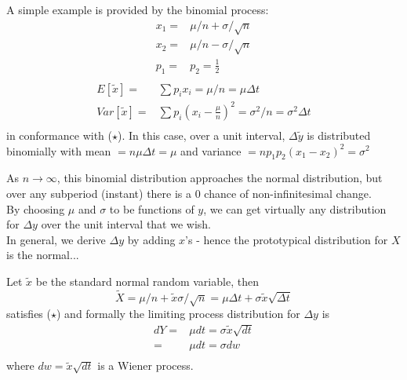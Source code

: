 \documentclass[
14pt,notheorems,hyperref={pdfauthor=whatever}
]{beamer}
\begin{document}
\begin{frame}
A simple example is provided by the binomial process:\\
\begin{align*}
    x_1 =& \mu/n + \sigma/\sqrt{n}\\
    x_2 =& \mu/n - \sigma/\sqrt{n}\\
    p_1 =& p_2 = \frac{1}{2}\\
\end{align*}
\begin{align*}
    E[\tilde x] =& \sum p_i x_i = \mu / n = \mu \Delta t\\
    Var[\tilde x] =& \sum p_i (x_i-\frac{\mu}{n})^2 = \sigma^2/n = \sigma^2 \Delta t\\
\end{align*}
in conformance with ($\star$). In this case, over a unit interval, $\Delta \tilde y$ is distributed binomially with mean $=n\mu\Delta t = \mu$ and variance $=np_1p_2(x_1-x_2)^2=\sigma^2$\\
\end{frame}

\begin{frame}
As $n\to\infty$, this binomial distribution approaches the normal distribution, but over any subperiod (instant) there is a 0 chance of non-infinitesimal change.\\
\hfill\break
By choosing $\mu$ and $\sigma$ to be functions of $y$, we can get virtually any distribution for $\Delta y$ over the unit interval that we wish.\\
\hfill\break
In general, we derive $\Delta y$ by adding $x$'s - hence the prototypical distribution for $X$ is the normal...\\
\end{frame}

\begin{frame}
Let $\tilde x$ be the standard normal random variable, then\\
\[\tilde X = \mu/n + \tilde x \sigma/\sqrt{n} = \mu \Delta t + \sigma\tilde x \sqrt{\Delta t}\]
satisfies ($\star$) and formally the limiting process distribution for $\Delta y$ is\\
\begin{align*}
    dY =& \mu dt = \sigma \tilde x \sqrt{dt}\\
    =& \mu dt = \sigma dw\\
\end{align*}
where $dw=\tilde x \sqrt{dt}$ is a Wiener process.\\
\end{frame}
\end{document}
